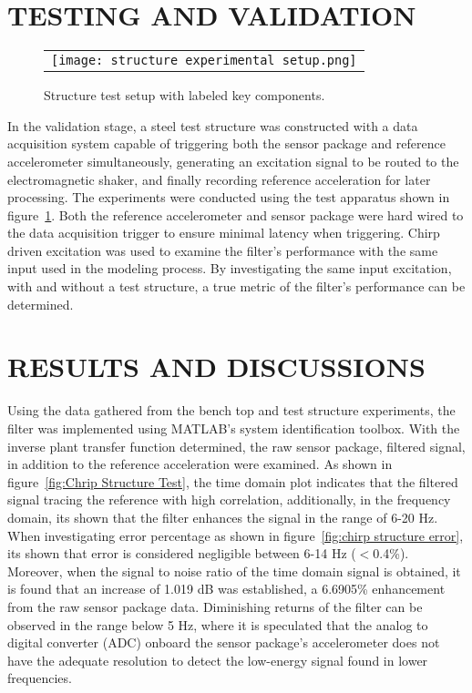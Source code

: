 \documentclass[]{spie}  %
\begin{document}
	\section{TESTING AND VALIDATION}
	
		\begin{figure} [H]
		\begin{center}
			\begin{tabular}{c} 
				\texttt{[image: structure experimental setup.png]}
			\end{tabular}
		\end{center}
		\caption[example] 
		{ \label{fig:structure experimental setup} 
			Structure test setup with labeled key components.}
	\end{figure} 
	
	In the validation stage, a steel test structure was constructed with a data acquisition system capable of triggering both the sensor package and reference accelerometer simultaneously, generating an excitation signal to be routed to the electromagnetic shaker, and finally recording reference acceleration for later processing. The experiments were conducted using the test apparatus shown in figure~\ref{fig:structure experimental setup}. Both the reference accelerometer and sensor package were hard wired to the data acquisition trigger to ensure minimal latency when triggering. Chirp driven excitation was used to examine the filter’s performance with the same input used in the modeling process. By investigating the same input excitation, with and without a test structure, a true metric of the filter’s performance can be determined.  
		
	\section{RESULTS AND DISCUSSIONS}
	Using the data gathered from the bench top and test structure experiments, the filter was implemented using MATLAB’s system identification toolbox. With the inverse plant transfer function determined, the raw sensor package, filtered signal, in addition to the reference acceleration were examined. As shown in figure~\ref{fig:Chrip Structure Test}, the time domain plot indicates that the filtered signal tracing the reference with high correlation, additionally, in the frequency domain, its shown that the filter enhances the signal in the range of 6-20 Hz. When investigating error percentage as shown in figure~\ref{fig:chirp structure error}, its shown that error is considered negligible between 6-14 Hz ($<$0.4\%). Moreover, when the signal to noise ratio of the time domain signal is obtained, it is found that an increase of 1.019 dB was established, a 6.6905\% enhancement from the raw sensor package data. Diminishing returns of the filter can be observed in the range below 5 Hz, where it is speculated that the analog to digital converter (ADC) onboard the sensor package’s accelerometer does not have the adequate resolution to detect the low-energy signal found in lower frequencies.
	
\end{document}
